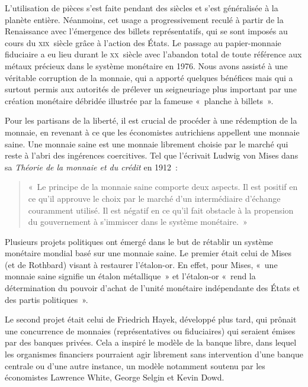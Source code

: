 
L'utilisation de pièces s'est faite pendant des siècles et s'est généralisée à la planète entière. Néanmoins, cet usage a progressivement reculé à partir de la Renaissance avec l'émergence des billets représentatifs, qui se sont imposés au cours du \textsc{xix}\ieme{}~siècle grâce à l'action des États. Le passage au papier-monnaie fiduciaire a eu lieu durant le \textsc{xx}\ieme{}~siècle avec l'abandon total de toute référence aux métaux précieux dans le système monétaire en 1976. Nous avons assisté à une véritable corruption de la monnaie, qui a apporté quelques bénéfices mais qui a surtout permis aux autorités de prélever un seigneuriage plus important par une création monétaire débridée illustrée par la fameuse «~planche à billets~».


Pour les partisans de la liberté, il est crucial de procéder à une rédemption de la monnaie, en revenant à ce que les économistes autrichiens appellent une monnaie saine. Une monnaie saine est une monnaie librement choisie par le marché qui reste à l'abri des ingérences coercitives. Tel que l'écrivait Ludwig von Mises dans sa \emph{Théorie de la monnaie et du crédit} en 1912~:

\begin{quote}
«~Le principe de la monnaie saine comporte deux aspects. Il est positif en ce qu'il approuve le choix par le marché d'un intermédiaire d'échange couramment utilisé. Il est négatif en ce qu'il fait obstacle à la propension du gouvernement à s'immiscer dans le système monétaire.~»
\end{quote}

Plusieurs projets politiques ont émergé dans le but de rétablir un système monétaire mondial basé sur une monnaie saine. Le premier était celui de Mises (et de Rothbard) visant à restaurer l'étalon-or. En effet, pour Mises, «~une monnaie saine signifie un étalon métallique~» et l'étalon-or «~rend la détermination du pouvoir d'achat de l'unité monétaire indépendante des États et des partis politiques~».

Le second projet était celui de Friedrich Hayek, développé plus tard, qui prônait une concurrence de monnaies (représentatives ou fiduciaires) qui seraient émises par des banques privées. Cela a inspiré le modèle de la banque libre, dans lequel les organismes financiers pourraient agir librement sans intervention d'une banque centrale ou d'une autre instance, un modèle notamment soutenu par les économistes Lawrence White, George Selgin et Kevin Dowd.


